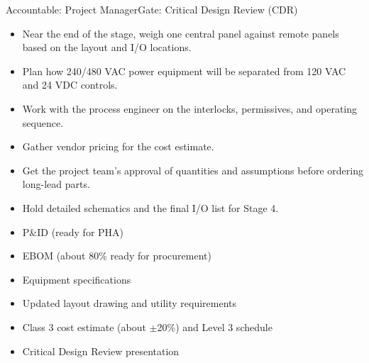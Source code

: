 \begin{stagecard}{Accountable: Project Manager}{Gate: Critical Design Review (CDR)}
\begin{itemize}[leftmargin=*,itemsep=1pt,topsep=2pt]
  \item Near the end of the stage, weigh one central panel against remote panels based on the layout and I/O locations.
  \item Plan how 240/480 VAC power equipment will be separated from 120 VAC and 24 VDC controls.
  \item Work with the process engineer on the interlocks, permissives, and operating sequence.
  \item Gather vendor pricing for the cost estimate.
  \item Get the project team's approval of quantities and assumptions before ordering long-lead parts.
  \item Hold detailed schematics and the final I/O list for Stage 4.
\end{itemize}
\tcbline
{}\par
\begin{minipage}[t]{0.485\linewidth}
\begin{itemize}[leftmargin=*,itemsep=1pt,topsep=2pt]
  \item P\&ID (ready for PHA)
  \item EBOM (about 80\% ready for procurement)
  \item Equipment specifications
\end{itemize}
\end{minipage}\hfill
\begin{minipage}[t]{0.485\linewidth}
\begin{itemize}[leftmargin=*,itemsep=1pt,topsep=2pt]
  \item Updated layout drawing and utility requirements
  \item Class 3 cost estimate (about $\pm$20\%) and Level 3 schedule
  \item Critical Design Review presentation
\end{itemize}
\end{minipage}
\tcbline
{}
\end{stagecard}

